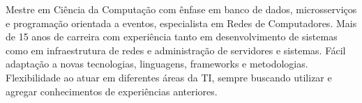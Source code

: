 

\begin{cvparagraph}

Mestre em Ciência da Computação com ênfase em banco de dados, microsserviços e programação orientada a eventos, especialista em Redes de Computadores. Mais de 15 anos de carreira com experiência tanto em desenvolvimento de sistemas como em infraestrutura de redes e administração de servidores e sistemas. Fácil adaptação a novas tecnologias, linguagens, frameworks e metodologias. Flexibilidade ao atuar em diferentes áreas da TI, sempre buscando utilizar e agregar conhecimentos de experiências anteriores.
\end{cvparagraph}
